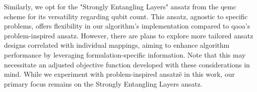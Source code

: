 Similarly, we opt for the "Strongly Entangling Layers" ansatz from the \acrshort{qemc} scheme for its versatility regarding qubit count. This ansatz, agnostic to specific problems, offers flexibility in our algorithm's implementation compared to \acrshort{qaoa}'s problem-inspired ansatz. However, there are plans to explore more tailored ansatz designs correlated with individual mappings, aiming to enhance algorithm performance by leveraging formulation-specific information. Note that this may necessitate an adjusted objective function developed with these considerations in mind. While we experiment with problem-inspired ansatzë in this work, our primary focus remains on the Strongly Entangling Layers ansatz.







